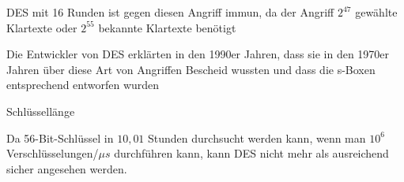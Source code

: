 \documentclass[a4paper]{article}
\begin{document}
\begin{multicols}{3}
\begin{itemize*}
\begin{itemize*}
                  \item DES mit 16 Runden ist gegen diesen Angriff immun, da der Angriff $2^{47}$ gewählte Klartexte oder $2^{55}$ bekannte Klartexte benötigt
                  \item Die Entwickler von DES erklärten in den 1990er Jahren, dass sie in den 1970er Jahren über diese Art von Angriffen Bescheid wussten und dass die s-Boxen entsprechend entworfen wurden
            \end{itemize*}
            \item Schlüssellänge
            \begin{itemize*}
                  \item Da 56-Bit-Schlüssel in $10,01$ Stunden durchsucht werden kann, wenn man $10^6$ Verschlüsselungen/$\mu s$ durchführen kann, kann DES nicht mehr als ausreichend sicher angesehen werden.
            \end{itemize*}
      \end{itemize*}


\end{multicols}
\end{document}
